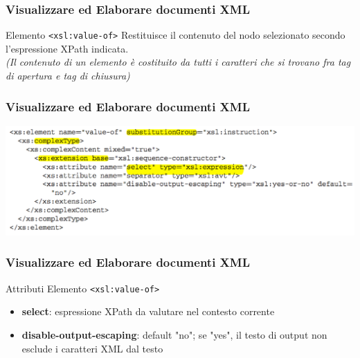 
\begin{frame}
    \frametitle{Visualizzare ed Elaborare documenti XML}
    \addtocounter{nframe}{1}
    

     \begin{block}{Elemento \texttt{<xsl:value-of>}}
        Restituisce il contenuto del nodo selezionato secondo l'espressione XPath indicata.
        \\ \textit{(Il contenuto di un elemento è costituito da tutti i caratteri che si trovano fra tag di apertura e tag di chiusura)}
     \end{block}
    
\end{frame}

\begin{frame}
    \frametitle{Visualizzare ed Elaborare documenti XML}
    \addtocounter{nframe}{1}
    
    \begin{center}
        \includegraphics[width=.9\textwidth]{imgs/Schema-value-of.png}
    \end{center}

\end{frame}

\begin{frame}
    \frametitle{Visualizzare ed Elaborare documenti XML}
    \addtocounter{nframe}{1}
    

     \begin{block}{Attributi Elemento \texttt{<xsl:value-of>}}
         \begin{itemize}
             \item \textbf{select}: espressione XPath da valutare nel contesto corrente
             \item \textbf{disable-output-escaping}: default "no"; se "yes", il testo di
             output non esclude i caratteri XML dal testo
        \end{itemize}
     \end{block}
    
\end{frame}

